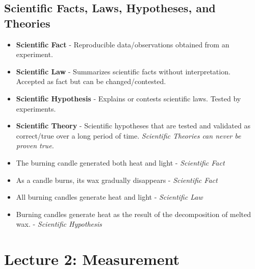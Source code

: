 \begin{minipage}{\textwidth}

\vspace{1em}

\subsection{Scientific Facts, Laws, Hypotheses, and Theories}
\begin{itemize}
	\item \textbf{Scientific Fact} - Reproducible data/observations obtained from an experiment.
	\item \textbf{Scientific Law} - Summarizes scientific facts without interpretation. Accepted as fact but can be changed/contested.
	\item \textbf{Scientific Hypothesis} - Explains or contests scientific laws. Tested by experiments.
	\item \textbf{Scientific Theory} - Scientific hypotheses that are tested and validated as correct/true over a long period of time. \textit{Scientific Theories can never be proven true.}
\end{itemize}

\begin{example}
\begin{itemize}
	\textbf{Facts, Laws, and Theories}
	
	\item The burning candle generated both heat and light - \textit{Scientific Fact}
	\item As a candle burns, its wax gradually disappears - \textit{Scientific Fact}
	\item All burning candles generate heat and light - \textit{Scientific Law}
	\item Burning candles generate heat as the result of the decomposition of melted wax. - \textit{Scientific Hypothesis}
\end{itemize}
\end{example}
\end{minipage}

\section{Lecture 2: Measurement}

